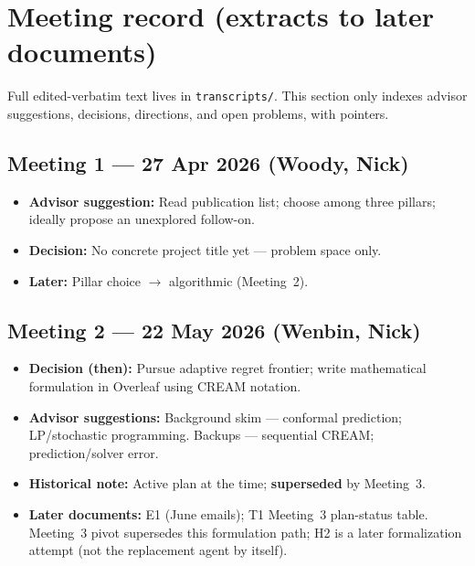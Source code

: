 \documentclass[11pt]{article}
\begin{document}
\section{Meeting record (extracts to later documents)}

Full edited-verbatim text lives in \texttt{transcripts/}. This section only indexes
advisor suggestions, decisions, directions, and open problems, with pointers.

\subsection{Meeting 1 --- 27 Apr 2026 (Woody, Nick)}
\begin{itemize}[leftmargin=*]
  \item \textbf{Advisor suggestion:} Read publication list; choose among three pillars; ideally
        propose an unexplored follow-on.
  \item \textbf{Decision:} No concrete project title yet --- problem space only.
  \item \textbf{Later:} Pillar choice $\to$ algorithmic (Meeting~2).
\end{itemize}

\subsection{Meeting 2 --- 22 May 2026 (Wenbin, Nick)}
\begin{itemize}[leftmargin=*]
  \item \textbf{Decision (then):} Pursue adaptive regret frontier; write mathematical formulation
        in Overleaf using CREAM notation.
  \item \textbf{Advisor suggestions:} Background skim --- conformal prediction; LP/stochastic
        programming. Backups --- sequential CREAM; prediction/solver error.
  \item \textbf{Historical note:} Active plan at the time; \textbf{superseded} by Meeting~3.
  \item \textbf{Later documents:} E1 (June emails); T1 Meeting~3 plan-status table.
        Meeting~3 pivot supersedes this formulation path; H2 is a later formalization attempt
        (not the replacement agent by itself).
\end{itemize}
\end{document}
